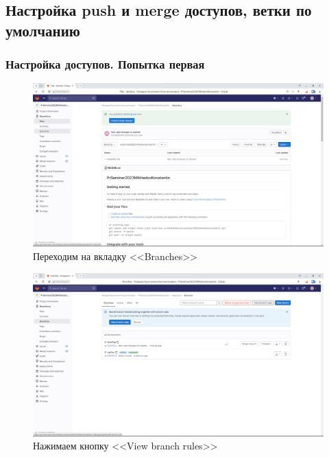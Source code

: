 \documentclass[a4paper]{article}
\begin{document}
  \subsection{Настройка push и merge доступов, ветки по умолчанию}

  \subsubsection{Настройка доступов. Попытка первая}

  \begin{figure}[H]
    \centering
    \includegraphics[width=\textwidth]{1_ (44)}
    \caption{Переходим на вкладку <<Branches>>}
  \end{figure}

  \begin{figure}[H]
    \centering
    \includegraphics[width=\textwidth]{1_ (43)}
    \caption{Нажимаем кнопку <<View branch rules>>}
  \end{figure}
\end{document}
